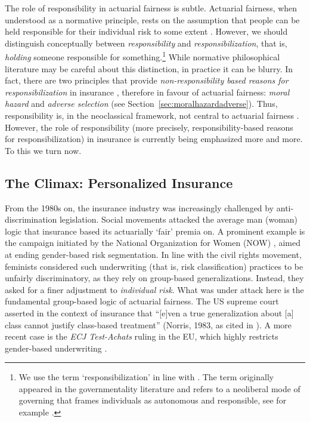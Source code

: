 \documentclass[11pt]{article} %
\begin{document}
The role of responsibility in actuarial fairness is subtle. Actuarial fairness, when understood as a normative principle, rests on the assumption that people can be held responsible for their individual risk to some extent \citep{lehtonen2015producing}. However, we should distinguish conceptually between \textit{responsibility} and \textit{responsibilization}, that is, \textit{holding} someone responsible for something.\footnote{We use the term `responsibilization' in line with \citet{andersen2015luck}. The term originally appeared in the governmentality literature and refers to a neoliberal mode of governing that frames individuals as autonomous and responsible, see for example \citep{shamir2008age,pyysiainen2017neoliberal}.} While normative philosophical literature may be careful about this distinction, in practice it can be blurry. In fact, there are two principles that provide \textit{non-responsibility based reasons for responsibilization}  in insurance \citep{andersen2015luck}, therefore in favour of actuarial fairness: \textit{moral hazard} and \textit{adverse selection} (see Section~\ref{sec:moralhazardadverse}).
Thus, responsibility is, in the neoclassical framework, not central to actuarial fairness \citep{landes2015fair}.
However, the role of responsibility (more precisely, responsibility-based reasons for responsibilization) in insurance is currently being emphasized more and more. To this we turn now.





\subsection{The Climax: Personalized Insurance}
\label{sec:personalized}
From the 1980s on, the insurance industry was increasingly challenged by anti-discrimination legislation. Social movements attacked the average man (woman) logic that insurance based its actuarially `fair' premia on. A prominent example is the campaign initiated by the National Organization for Women (NOW) \citep{krippner2022person,krippner2023unmasked}, aimed at ending gender-based risk segmentation. In line with the civil rights movement, feminists considered such underwriting (that is, risk classification) practices to be unfairly discriminatory, as they rely on group-based generalizations. Instead, they asked for a finer adjustment to \textit{individual risk}. What was under attack here is the fundamental group-based logic of actuarial fairness. The US supreme court asserted in the context of insurance that ``[e]ven a true generalization about [a] class cannot justify
class-based treatment'' (Norris, 1983, as cited in \citet{avraham2017discrimination}). A more recent case is the \textit{ECJ Test-Achats} ruling in the EU, which highly restricts gender-based underwriting \citep{rebert2015right,cevolini2022actuarial}. 
\end{document}
